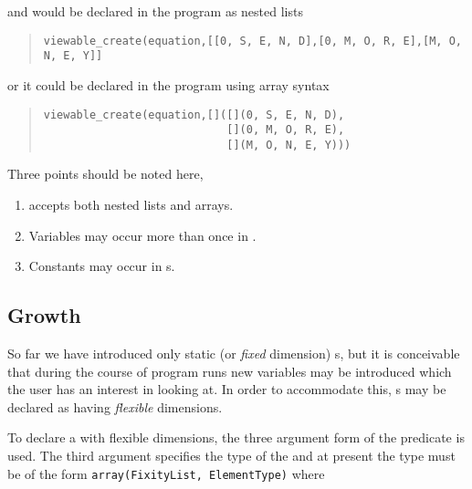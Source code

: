 and would be declared in the program as nested lists

\begin{quote}\begin{verbatim}
viewable_create(equation,[[0, S, E, N, D],[0, M, O, R, E],[M, O, N, E, Y]]
\end{verbatim}\end{quote}

or it could be declared in the program using {\eclipse} array syntax
\begin{quote}\begin{verbatim}
viewable_create(equation,[]([](0, S, E, N, D),
                            [](0, M, O, R, E),
                            [](M, O, N, E, Y)))
\end{verbatim}\end{quote}

Three points should be noted here,
\begin{enumerate}
\item \viewablecreatetwo{} accepts both nested lists and arrays.
\item Variables may occur more than once in \viewable{}.
\item Constants may occur in \viewable{}s.
\end{enumerate}


\subsection{Growth}

So far we have introduced only static (or \emph{fixed} dimension)
\viewable{}s, but it is conceivable that during the course of program
runs new variables may be introduced which the user has an interest in
looking at.  In order to accommodate this, \viewable{}s may be
declared as having \emph{flexible} dimensions.

To declare a \viewable{} with flexible dimensions, the three argument
form of the \viewablecreatethree{} predicate is used.  The third
argument specifies the type of the \viewable{} and at present the type
must be of the form \texttt{array(FixityList, ElementType)} where

